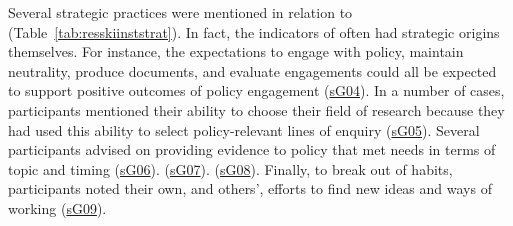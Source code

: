 Several strategic practices were mentioned in relation to \skiinst{} (Table~\ref{tab:resskiinststrat}). In fact, the indicators of \skiinst{} often had strategic origins themselves. For instance, the expectations to engage with policy, maintain neutrality, produce documents, and evaluate engagements could all be expected to support positive outcomes of policy engagement (\hyperref[tab:resskiinststrat]{sG04}). In a number of cases, participants mentioned their ability to choose their field of research because they had used this ability to select policy-relevant lines of enquiry (\hyperref[tab:resskiinststrat]{sG05}). Several participants advised on providing evidence to policy that met needs in terms of topic and timing (\hyperref[tab:resskiinststrat]{sG06}).  (\hyperref[tab:resskiinststrat]{sG07}).  (\hyperref[tab:resskiinststrat]{sG08}). Finally, to break out of habits, participants noted their own, and others', efforts to find new ideas and ways of working (\hyperref[tab:resskiinststrat]{sG09}).

\subsection{\titinfr}\label{sec:resskiinfr}

